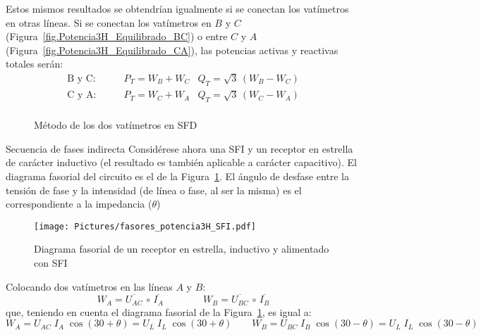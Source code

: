 \documentclass[11pt]{book} %
\makeatletter
\numberwithin{dummy}{section}
\theoremstyle{ocrenumbox}
\theoremstyle{blacknumex}
\theoremstyle{blacknumbox}
\theoremstyle{ocrenum}
\renewcommand{\subsubsection}{\@startsection {subsubsection}{3}{\z@}
{-2ex \@plus -0.1ex \@minus -.2ex}
{.2ex \@plus.2ex }
{\normalfont\small\sffamily\bfseries}}
\newlength\esp
\makeatother
\begin{document}
Estos mismos resultados se obtendrían igualmente si se conectan los vatímetros en otras líneas. Si se conectan los vatímetros en $B$ y $C$ (Figura~\ref{fig.Potencia3H_Equilibrado_BC}) o entre $C$ y $A$ (Figura~\ref{fig.Potencia3H_Equilibrado_CA}), las potencias activas y reactivas totales serán: 
\begin{align*}
    \text{B y C}: &\qquad P_T=W_B + W_C  &Q_T=\sqrt{3}\,(W_B - W_C)\\
    \text{C y A}: &\qquad P_T=W_C + W_A  &Q_T=\sqrt{3}\,(W_C - W_A)\\
\end{align*}
\begin{figure}[htbp]
    \centering
    \hfill
    \caption{Método de los dos vatímetros en SFD}
\end{figure}
  
  \subsubsection{Secuencia de fases indirecta}
	Considérese ahora una SFI y un receptor en estrella de carácter inductivo (el resultado es también aplicable a carácter capacitivo). El diagrama fasorial del circuito es el de la Figura~\ref{fig.fasores_potencia3H_SFI}. El ángulo de desfase entre la tensión de fase y la intensidad (de línea o fase, al ser la misma) es el correspondiente a la impedancia ($\theta$)
	\begin{figure}[htbp]
	    \centering
	    \texttt{[image: Pictures/fasores\_potencia3H\_SFI.pdf]}
	    \caption{Diagrama fasorial de un receptor en estrella, inductivo y alimentado con SFI}
	    \label{fig.fasores_potencia3H_SFI}
	\end{figure}
	
	Colocando dos vatímetros en las líneas $A$ y $B$:
	\begin{equation*}
	    W_A=\overline{U_{AC}}\,\circ\,\overline{I_A}\qquad\qquad W_B=\overline{U_{BC}}\,\circ\,\overline{I_B}
	\end{equation*}
	que, teniendo en cuenta el diagrama fasorial de la Figura~\ref{fig.fasores_potencia3H_SFI}, es igual a: 
	\begin{equation*}
	    W_A={U_{AC}}\; {I_A}\;\cos{(30+\theta)}=U_L\;I_L\;\cos{(30+\theta)}\qquad W_B={U_{BC}}\; {I_B}\;\cos{(30-\theta)}=U_L\;I_L\;\cos{(30-\theta)}
	\end{equation*}
	
\end{document}

